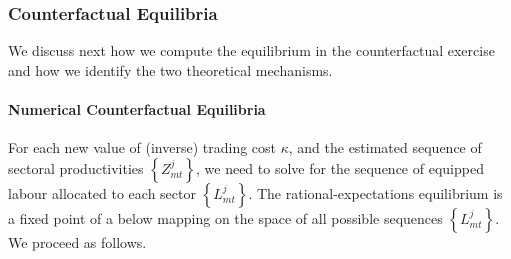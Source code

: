 \documentclass{article}
\begin{document}
\subsubsection{Counterfactual Equilibria}

We discuss next how we compute the equilibrium in the counterfactual
exercise and how we identify the two theoretical mechanisms.

\paragraph{Numerical Counterfactual Equilibria}

For each new value of (inverse) trading cost $\kappa $, and the estimated
sequence of sectoral productivities $\left\{ Z_{mt}^{j}\right\} $, we need
to solve for the sequence of equipped labour allocated to each sector $%
\left\{ L_{mt}^{j}\right\} $. The rational-expectations equilibrium is a
fixed point of a below mapping on the space of all possible sequences $%
\left\{ L_{mt}^{j}\right\} $. We proceed as follows.
\end{document}
